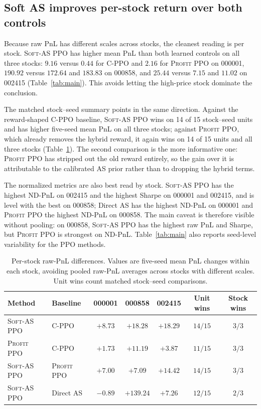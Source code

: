 \documentclass{article}
\newcommand{\softas}{\textsc{Soft-AS PPO}}
\newcommand{\cppo}{\textsc{C-PPO}}
\newcommand{\profitppo}{\textsc{Profit PPO}}
\begin{document}
\subsection{Soft AS improves per-stock return over both controls}


Because raw PnL has different scales across stocks, the cleanest reading is per stock. \softas{} has higher mean PnL than both learned controls on all three stocks: $9.16$ versus $0.44$ for \cppo{} and $2.16$ for \profitppo{} on 000001, $190.92$ versus $172.64$ and $183.83$ on 000858, and $25.44$ versus $7.15$ and $11.02$ on 002415 (Table~\ref{tab:main}). This avoids letting the high-price stock dominate the conclusion.

The matched stock--seed summary points in the same direction. Against the reward-shaped \cppo{} baseline, \softas{} wins on 14 of 15 stock--seed units and has higher five-seed mean PnL on all three stocks; against \profitppo{}, which already removes the hybrid reward, it again wins on 14 of 15 units and all three stocks (Table~\ref{tab:paired}). The second comparison is the more informative one: \profitppo{} has stripped out the old reward entirely, so the gain over it is attributable to the calibrated AS prior rather than to dropping the hybrid terms.

The normalized metrics are also best read by stock. \softas{} has the highest ND-PnL on 002415 and the highest Sharpe on 000001 and 002415, and is level with the best on 000858; Direct AS has the highest ND-PnL on 000001 and \profitppo{} the highest ND-PnL on 000858. The main caveat is therefore visible without pooling: on 000858, \softas{} has the highest raw PnL and Sharpe, but \profitppo{} is strongest on ND-PnL. Table~\ref{tab:main} also reports seed-level variability for the PPO methods.




\begin{table}[H]
\centering
\small
\caption{Per-stock raw-PnL differences. Values are five-seed mean PnL changes within each stock, avoiding pooled raw-PnL averages across stocks with different scales. Unit wins count matched stock--seed comparisons.}
\label{tab:paired}
\begin{tabular}{llccccc}
\toprule
Method & Baseline & 000001 & 000858 & 002415 & Unit wins & Stock wins \\
\midrule
\softas{} & \cppo{} & $+8.73$ & $+18.28$ & $+18.29$ & $14/15$ & $3/3$ \\
\profitppo{} & \cppo{} & $+1.73$ & $+11.19$ & $+3.87$ & $11/15$ & $3/3$ \\
\softas{} & \profitppo{} & $+7.00$ & $+7.09$ & $+14.42$ & $14/15$ & $3/3$ \\
\softas{} & Direct AS & $-0.89$ & $+139.24$ & $+7.26$ & $12/15$ & $2/3$ \\
\bottomrule
\end{tabular}
\end{table}
\end{document}
